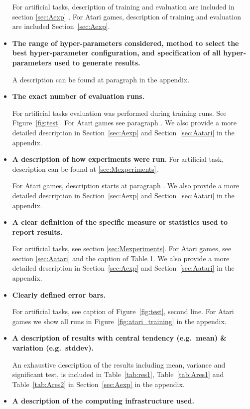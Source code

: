 \documentclass{article}
\begin{document}
\begin{appendices}
\begin{itemize}
    For artificial tasks, description of training and evaluation are included in section \ref{sec:Aexp} . For Atari games, description of training and evaluation are included Section~\ref{sec:Aexp}.
    \item \textbf{The range of hyper-parameters considered, method to select the best hyper-parameter configuration, and specification of all hyper-parameters used to generate results.}
    
    A description can be found at paragraph  in the appendix. 
    \item \textbf{The exact number of evaluation runs.}
    
    For artificial tasks evaluation was performed during training runs. See Figure~\ref{fig:test}.
    For Atari games see paragraph .
    We also provide a more detailed description in Section~\ref{sec:Aexp} and Section~\ref{sec:Aatari} in the appendix.
    \item \textbf{A description of how experiments were run}.
    For artificial task, description can be found at \ref{sec:Mexperiments}.
    
    For Atari games, description starts at paragraph .
    We also provide a more detailed description in Section~\ref{sec:Aexp} and Section~\ref{sec:Aatari} in the appendix.
    \item \textbf{A clear definition of the specific measure or statistics used to report results.}
    
For artificial tasks, see section \ref{sec:Mexperiments}.
For Atari games, see section \ref{sec:Aatari} and the caption of Table 1. 
We also provide a more detailed description in Section~\ref{sec:Aexp} and Section~\ref{sec:Aatari} in the appendix.
    \item \textbf{Clearly defined error bars.}
    
For artificial tasks, see caption of Figure~\ref{fig:test}, second line.
For Atari games we show all runs in Figure~\ref{fig:atari_training} in the appendix.
    \item \textbf{A description of results with central tendency (e.g.\ mean) \& variation (e.g.\ stddev).}
    
An exhaustive description of the results including mean, variance and significant test, is included in Table~\ref{tab:res1}, Table~\ref{tab:Ares1} and Table~\ref{tab:Ares2} in Section~\ref{sec:Aexp} in the appendix.
    \item \textbf{A description of the computing infrastructure used.}
    

\end{itemize}
\end{appendices}
\end{document}
